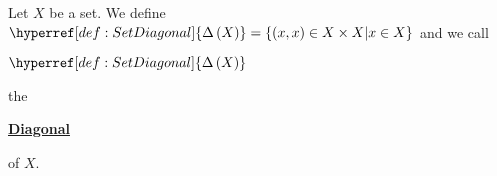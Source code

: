 \newcommand{\SetDiagonal}[0]{
    \textbf{\hyperref[def:SetDiagonal]{Diagonal}}
}
\newcommand{\SetDiagonals}[0]{
    \textbf{\hyperref[def:SetDiagonal]{Diagonals}}
}

\newcommand{\scSetDiagonal}[1]{
    \ensuremath{\hyperref[def:SetDiagonal]{\Delta\pa{#1}}}
}\begin{df}
\label{def:SetDiagonal}

\rm
    Let $X$ be a set. 
    We define 
    $\scSetDiagonal{X}=\{(x,x)\in X \times X | x \in X\}$
    and we call 
    \scSetDiagonal{X} 
    the 
    \SetDiagonal
    of $X$.
\end{df}
